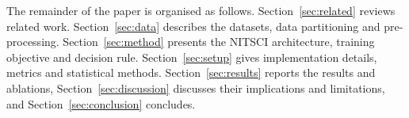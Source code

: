 The remainder of the paper is organised as follows. Section~\ref{sec:related} reviews related work.
Section~\ref{sec:data} describes the datasets, data partitioning and pre-processing. Section~\ref{sec:method}
presents the NITSCI architecture, training objective and decision rule. Section~\ref{sec:setup} gives implementation
details, metrics and statistical methods. Section~\ref{sec:results} reports the results and ablations,
Section~\ref{sec:discussion} discusses their implications and limitations, and Section~\ref{sec:conclusion} concludes.
